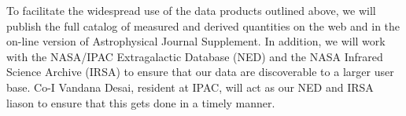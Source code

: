 \documentclass[11pt,preprint]{aastex}
\begin{document}
To facilitate the widespread use of the data products outlined above, we will publish the full catalog of measured and derived quantities on the web and in the on-line version of Astrophysical Journal Supplement. In addition, we will work with the NASA/IPAC Extragalactic Database (NED) and the NASA Infrared Science Archive (IRSA) to ensure that our data are discoverable to a larger user base. Co-I Vandana Desai, resident at IPAC, will act as our NED and IRSA liason to ensure that this gets done in a timely manner.
\end{document}
